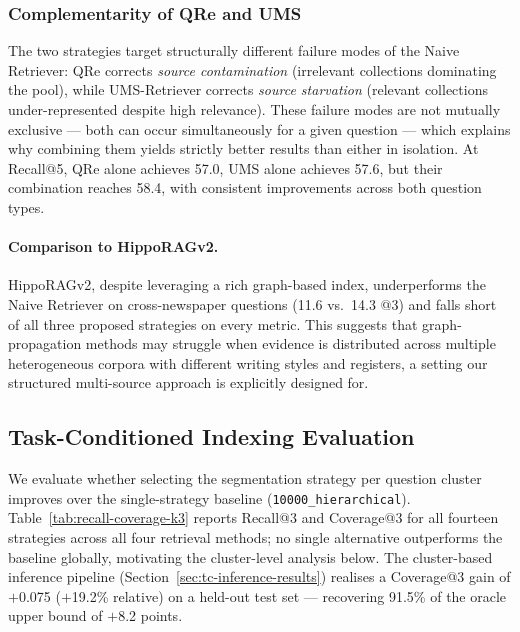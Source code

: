 \subsubsection{Complementarity of QRe and UMS}
\label{sec:results-complementarity}

The two strategies target structurally different failure modes of the Naive Retriever:
QRe corrects \emph{source contamination} (irrelevant collections dominating the pool),
while UMS-Retriever corrects \emph{source starvation} (relevant collections
under-represented despite high relevance).
These failure modes are not mutually exclusive — both can occur simultaneously for
a given question — which explains why combining them yields strictly better results
than either in isolation.
At Recall@5, QRe alone achieves 57.0, UMS alone achieves 57.6, but their combination
reaches 58.4, with consistent improvements across both question types.

\paragraph{Comparison to HippoRAGv2.}
HippoRAGv2, despite leveraging a rich graph-based index, underperforms the Naive
Retriever on cross-newspaper questions (11.6 vs.\ 14.3 @3) and falls short
of all three proposed strategies on every metric.
This suggests that graph-propagation methods may struggle when evidence is distributed
across multiple heterogeneous corpora with different writing styles and registers,
a setting our structured multi-source approach is explicitly designed for.

\subsection{Task-Conditioned Indexing Evaluation}
\label{sec:indexing-results}

We evaluate whether selecting the segmentation strategy per question cluster
improves over the single-strategy baseline (\texttt{10000\_hierarchical}).
Table~\ref{tab:recall-coverage-k3} reports Recall@3 and Coverage@3 for all
fourteen strategies across all four retrieval methods; no single alternative
outperforms the baseline globally, motivating the cluster-level analysis below.
The cluster-based inference pipeline (Section~\ref{sec:tc-inference-results})
realises a Coverage@3 gain of $+$0.075 ($+$19.2\% relative) on a
held-out test set --- recovering 91.5\% of the oracle upper bound of $+$8.2 points.

